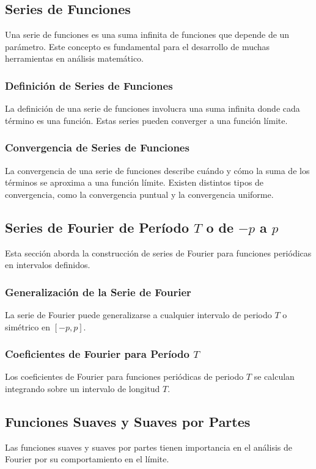 \subsection{Series de Funciones}
Una serie de funciones es una suma infinita de funciones que depende de un parámetro. Este concepto es fundamental para el desarrollo de muchas herramientas en análisis matemático.

\subsubsection{Definición de Series de Funciones}
La definición de una serie de funciones involucra una suma infinita donde cada término es una función. Estas series pueden converger a una función límite.

\subsubsection{Convergencia de Series de Funciones}
La convergencia de una serie de funciones describe cuándo y cómo la suma de los términos se aproxima a una función límite. Existen distintos tipos de convergencia, como la convergencia puntual y la convergencia uniforme.


\subsection{Series de Fourier de Período $T$ o de $-p$ a $p$}
Esta sección aborda la construcción de series de Fourier para funciones periódicas en intervalos definidos.

\subsubsection{Generalización de la Serie de Fourier}
La serie de Fourier puede generalizarse a cualquier intervalo de periodo $T$ o simétrico en $[-p, p]$.

\subsubsection{Coeficientes de Fourier para Período $T$}
Los coeficientes de Fourier para funciones periódicas de periodo $T$ se calculan integrando sobre un intervalo de longitud $T$.

\subsection{Funciones Suaves y Suaves por Partes}
Las funciones suaves y suaves por partes tienen importancia en el análisis de Fourier por su comportamiento en el límite.


